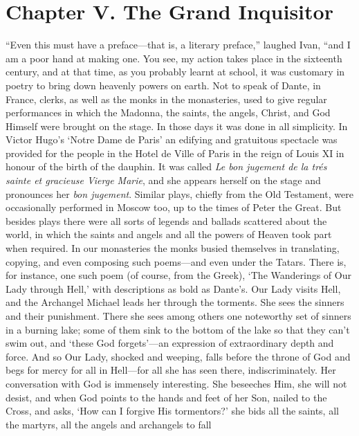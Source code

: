 \section*{Chapter V. The Grand Inquisitor}


``Even this must have a preface---that is, a literary preface,''
laughed Ivan, ``and I am a poor hand at making one. You see, my action
takes place in the sixteenth century, and at that time, as you
probably learnt at school, it was customary in poetry to bring down
heavenly powers on earth. Not to speak of Dante, in France, clerks, as
well as the monks in the monasteries, used to give regular
performances in which the Madonna, the saints, the angels, Christ, and
God Himself were brought on the stage. In those days it was done in
all simplicity. In Victor Hugo's `Notre Dame de Paris' an edifying and
gratuitous spectacle was provided for the people in the Hotel de Ville
of Paris in the reign of Louis XI in honour of the birth of the
dauphin. It was  called \textit{Le bon jugement de la tr\'es
sainte et gracieuse Vierge Marie}, and she appears herself on the
stage and pronounces her \textit{bon jugement}. Similar plays, chiefly
from the Old Testament, were occasionally performed in Moscow too, up
to the times of Peter the Great. But besides plays there were all
sorts of legends and ballads scattered about the world, in which the
saints and angels and all the powers of Heaven took part when
required. In our monasteries the monks busied themselves in
translating, copying, and even composing such po\-ems---and even under
the Tatars. There is, for instance, one such poem (of course, from the
Greek), `The Wanderings of Our Lady through Hell,' with descriptions
as bold as Dante's. Our Lady visits Hell, and the Archangel Michael
leads her through the torments. She sees the sinners and their
punishment. There she sees among others one noteworthy set of sinners
in a burning lake; some of them sink to the bottom of the lake so that
they can't swim out, and `these God forgets'---an expression of
extraordinary depth and force. And so Our Lady, shocked and weeping,
falls before the throne of God and begs for mercy for all in
Hell---for all she has seen there, indiscriminately. Her conversation
with God is immensely interesting. She beseeches Him, she will not
desist, and when God points to the hands and feet of her Son, nailed
to the Cross, and asks, `How can I forgive His tormentors?' she bids
all the saints, all the martyrs, all the angels and archangels to fall
